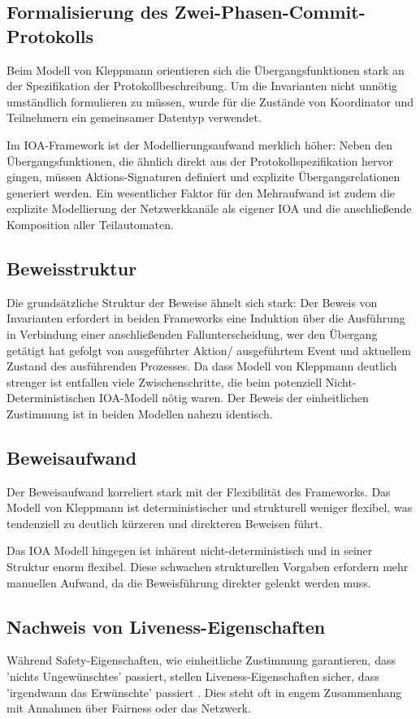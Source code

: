 \documentclass[12pt,a4paper]{tucarticle2019}
\begin{document}
	\subsection{Formalisierung des Zwei-Phasen-Commit-Protokolls}
	Beim Modell von Kleppmann orientieren sich die Übergangsfunktionen stark an der Spezifikation der Protokollbeschreibung. Um die Invarianten nicht unnötig umständlich formulieren zu müssen, wurde für die Zustände von Koordinator und Teilnehmern ein gemeinsamer Datentyp verwendet.
	
	Im IOA-Framework ist der Modellierungsaufwand merklich höher: Neben den Übergangsfunktionen, die ähnlich direkt aus der Protokollspezifikation hervor gingen, müssen Aktions-Signaturen definiert und explizite Übergangsrelationen generiert werden. Ein wesentlicher Faktor für den Mehraufwand ist zudem die explizite Modellierung der Netzwerkkanäle als eigener IOA und die anschließende Komposition aller Teilautomaten.
	\subsection{Beweisstruktur}
	Die grundsätzliche Struktur der Beweise ähnelt sich stark:
	Der Beweis von Invarianten erfordert in beiden Frameworks eine Induktion über die Ausführung in Verbindung einer anschließenden Fallunterscheidung, wer den Übergang getätigt hat gefolgt von ausgeführter Aktion/ ausgeführtem Event und aktuellem Zustand des ausführenden Prozesses.
	Da dass Modell von Kleppmann deutlich strenger ist entfallen viele Zwischenschritte, die beim potenziell Nicht-Deterministischen IOA-Modell nötig waren.
	Der Beweis der einheitlichen Zustimmung ist in beiden Modellen nahezu identisch.
	\subsection{Beweisaufwand}
	Der Beweisaufwand korreliert stark mit der Flexibilität des Frameworks. Das Modell von Kleppmann ist deterministischer und strukturell weniger flexibel, was tendenziell zu deutlich kürzeren und direkteren Beweisen führt.
	
	Das IOA Modell hingegen ist inhärent nicht-deterministisch und in seiner Struktur enorm flexibel. Diese schwachen strukturellen Vorgaben erfordern mehr manuellen Aufwand, da die Beweisführung direkter gelenkt werden muss.
	\subsection{Nachweis von Liveness-Eigenschaften}
	Während Safety-Eigenschaften, wie einheitliche Zustimmung garantieren, dass 'nichts Ungewünschtes' passiert, stellen Liveness-Eigenschaften sicher, dass 'irgendwann das Erwünschte' passiert \cite{kleppmannbook}. Dies steht oft in engem Zusammenhang mit Annahmen über Fairness oder das Netzwerk. 
	
\end{document}
